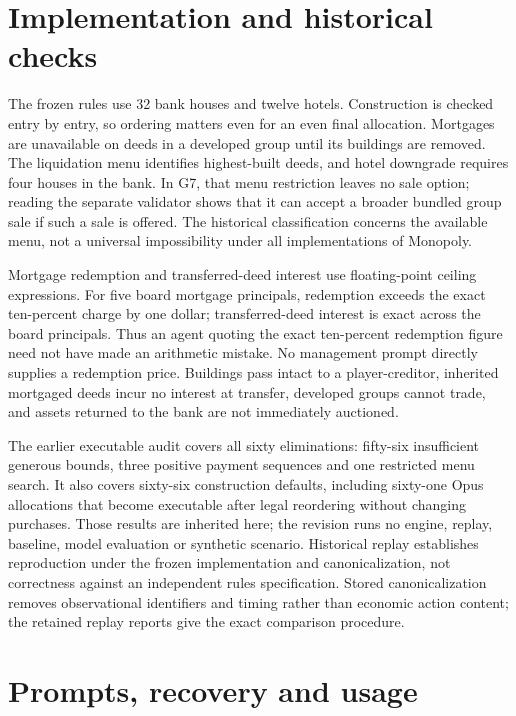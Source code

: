 \section{Implementation and historical checks}
\label{app:rules}

The frozen rules use 32 bank houses and twelve hotels. Construction is checked entry by entry, so ordering matters even for an even final allocation. Mortgages are unavailable on deeds in a developed group until its buildings are removed. The liquidation menu identifies highest-built deeds, and hotel downgrade requires four houses in the bank. In G7, that menu restriction leaves no sale option; reading the separate validator shows that it can accept a broader bundled group sale if such a sale is offered. The historical classification concerns the available menu, not a universal impossibility under all implementations of Monopoly.

Mortgage redemption and transferred-deed interest use floating-point ceiling expressions. For five board mortgage principals, redemption exceeds the exact ten-percent charge by one dollar; transferred-deed interest is exact across the board principals. Thus an agent quoting the exact ten-percent redemption figure need not have made an arithmetic mistake. No management prompt directly supplies a redemption price. Buildings pass intact to a player-creditor, inherited mortgaged deeds incur no interest at transfer, developed groups cannot trade, and assets returned to the bank are not immediately auctioned.

The earlier executable audit covers all sixty eliminations: fifty-six insufficient generous bounds, three positive payment sequences and one restricted menu search. It also covers sixty-six construction defaults, including sixty-one Opus allocations that become executable after legal reordering without changing purchases. Those results are inherited here; the revision runs no engine, replay, baseline, model evaluation or synthetic scenario. Historical replay establishes reproduction under the frozen implementation and canonicalization, not correctness against an independent rules specification. Stored canonicalization removes observational identifiers and timing rather than economic action content; the retained replay reports give the exact comparison procedure.

\section{Prompts, recovery and usage}
\label{app:prompts}

